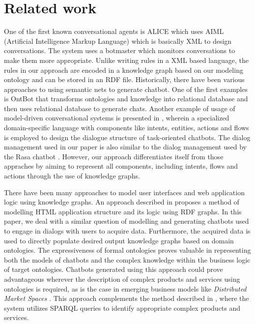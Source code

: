 \documentclass[runningheads]{llncs}
\begin{document}
\section{Related work}
One of the first known conversational agents is ALICE \cite{wallace2009anatomy} which uses AIML (Artificial Intelligence Markup Language) which is basically XML to design conversations. The system uses a botmaster which monitors conversations to make them more appropriate. Unlike writing rules in a XML based language, the rules in our approach are encoded in a knowledge graph based on our modeling ontology and can be stored in an RDF file. Historically, there have been various approaches to using semantic nets to generate chatbot. One of the first examples is OntBot \cite{al2011ontbot} that transforms ontologies and knowledge into relational database and then uses relational database to generate chats. Another example of usage of model-driven conversational systems is presented in \cite{perez2020model}, wherein a specialized domain-specific language with components like intents, entities, actions and flows is employed to design the dialogue structure of task-oriented chatbots. The dialog management used in our paper is also similar to the dialog management used by the Rasa chatbot \cite{bocklisch2017rasa}. However, our approach differentiates itself from those appraches by aiming to represent all components, including intents, flows and actions through the use of knowledge graphs. 

There have been many approaches to model user interfaces and web application logic using knowledge graphs. An approach described in \cite{rutesic2021enhanced} proposes a method of modelling HTML application structure and its logic using RDF graphs.
In this paper, we deal with a similar question of modelling and generating chatbots used to engage in dialogs with users to acquire data. Furthermore, the acquired data is used to directly populate desired output knowledge graphs based on domain ontologies. The expressiveness of formal ontologies proves valuable in representing both the models of chatbots and the complex knowledge within the business logic of target ontologies.
Chatbots generated using this approach could prove advantageous wherever the description of complex products and services using ontologies is required, as is the case in emerging business models like {\itshape Distributed Market Spaces} \cite{radonjic2020arising}. This approach complements the method described in \cite{hitz2016generic}, where the system utilizes SPARQL queries to identify appropriate complex products and services.  
\end{document}

